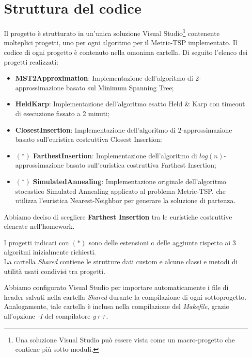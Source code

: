 \section{Struttura del codice}
\label{cap:code-structure}

Il progetto è strutturato in un'unica soluzione Visual Studio\footnote{Una soluzione Visual Studio può essere vista come un macro-progetto che contiene più sotto-moduli.} contenente molteplici progetti, uno per ogni algoritmo per il Metric-TSP implementato. Il codice di ogni progetto è contenuto nella omonima cartella. Di seguito l'elenco dei progetti realizzati:

\begin{itemize}
    \item \textbf{MST2Approximation}: Implementazione dell'algoritmo di $2$-approssimazione basato sul Minimum Spanning Tree;
    \item \textbf{HeldKarp}: Implementazione dell'algoritmo esatto Held \& Karp con timeout di esecuzione fissato a 2 minuti;
    \item \textbf{ClosestInsertion}: Implementazione dell'algoritmo di $2$-approssimazione basato sull'euristica costruttiva Closest Insertion;
    \item $(*)$ \textbf{FarthestInsertion}: Implementazione dell'algoritmo di $log(n)$-approssimazione basato sull'euristica costruttiva Farthest Insertion;
    \item $(*)$ \textbf{SimulatedAnnealing}: Implementazione originale dell'algoritmo stocastico Simulated Annealing applicato al problema Metric-TSP, che utilizza l'euristica Nearest-Neighbor per generare la soluzione di partenza.
\end{itemize}

\noindent Abbiamo deciso di scegliere \textbf{Farthest Insertion} tra le euristiche costruttive elencate nell'homework.

\noindent I progetti indicati con $(*)$ sono delle estensioni o delle aggiunte rispetto ai 3 algoritmi inizialmente richiesti.
\\

\noindent La cartella \textit{Shared} contiene le strutture dati custom e alcune classi e metodi di utilità usati
condivisi tra progetti.

\noindent Abbiamo configurato Visual Studio per importare automaticamente i file di header salvati nella cartella \textit{Shared}
durante la compilazione di ogni sottoprogetto. Analogamente, tale cartella è inclusa nella compilazione del \textit{Makefile}, grazie all'opzione \textit{-I} del compilatore \textit{g++}.

